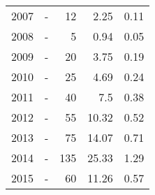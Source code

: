 \begin{longtable}{lXrrr}
        2007 & \multicolumn{1}{X}{-} & %
          \num{12} &
          \num[round-mode=places,round-precision=2]{2,25} &
          \num[round-mode=places,round-precision=2]{0,11} \\

        2008 & \multicolumn{1}{X}{-} & %
          \num{5} &
          \num[round-mode=places,round-precision=2]{0,94} &
          \num[round-mode=places,round-precision=2]{0,05} \\

        2009 & \multicolumn{1}{X}{-} & %
          \num{20} &
          \num[round-mode=places,round-precision=2]{3,75} &
          \num[round-mode=places,round-precision=2]{0,19} \\

        2010 & \multicolumn{1}{X}{-} & %
          \num{25} &
          \num[round-mode=places,round-precision=2]{4,69} &
          \num[round-mode=places,round-precision=2]{0,24} \\

        2011 & \multicolumn{1}{X}{-} & %
          \num{40} &
          \num[round-mode=places,round-precision=2]{7,5} &
          \num[round-mode=places,round-precision=2]{0,38} \\

        2012 & \multicolumn{1}{X}{-} & %
          \num{55} &
          \num[round-mode=places,round-precision=2]{10,32} &
          \num[round-mode=places,round-precision=2]{0,52} \\

        2013 & \multicolumn{1}{X}{-} & %
          \num{75} &
          \num[round-mode=places,round-precision=2]{14,07} &
          \num[round-mode=places,round-precision=2]{0,71} \\

        2014 & \multicolumn{1}{X}{-} & %
          \num{135} &
          \num[round-mode=places,round-precision=2]{25,33} &
          \num[round-mode=places,round-precision=2]{1,29} \\

        2015 & \multicolumn{1}{X}{-} & %
          \num{60} &
          \num[round-mode=places,round-precision=2]{11,26} &
          \num[round-mode=places,round-precision=2]{0,57} \\


\end{longtable}
